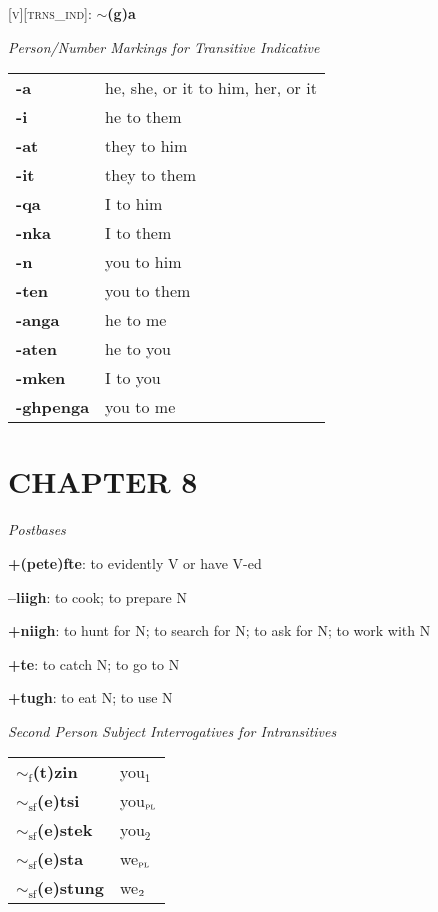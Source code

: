 \documentclass{article}
\begin{document}
\bigskip

\textsc{[v][trns\_ind]}: \textbf{$\sim$(g)a}

\bigskip

\textit{Person/Number Markings for Transitive Indicative}

\begin{tabular}{ l l }
\textbf{-a} & he, she, or it to him, her, or it\\
\textbf{-i} & he to them \\
\textbf{-at} & they to him \\
\textbf{-it} & they to them \\
\textbf{-qa} & I to him \\
\textbf{-nka} & I to them \\
\textbf{-n} & you to him \\
\textbf{-ten} & you to them \\
\textbf{-anga} & he to me \\
\textbf{-aten} & he to you \\
\textbf{-mken} & I to you \\
\textbf{-ghpenga} & you to me
\end{tabular}

\section{CHAPTER 8}

\textit{Postbases}
\begin{description}
\item \textbf{+(pete)fte}: to evidently V or have V-ed
\item \textbf{--liigh}: to cook; to prepare N
\item \textbf{+niigh}: to hunt for N; to search for N; to ask for N; to work with N
\item \textbf{+te}: to catch N; to go to N
\item \textbf{+tugh}: to eat N; to use N
\end{description}

\bigskip

\textit{Second Person Subject Interrogatives for Intransitives}

\begin{tabular}{ l l }
\textbf{$\sim_\text{f}$(t)zin} & you$_1$\\
\textbf{$\sim_\text{sf}$(e)tsi} & you$_\text{\textsc{pl}}$ \\
\textbf{$\sim_\text{sf}$(e)stek} & you$_2$ \\
\textbf{$\sim_\text{sf}$(e)sta} & we$_\text{\textsc{pl}}$ \\
\textbf{$\sim_\text{sf}$(e)stung} & we$_\text{\textsc{2}}$
\end{tabular}
\end{document}
